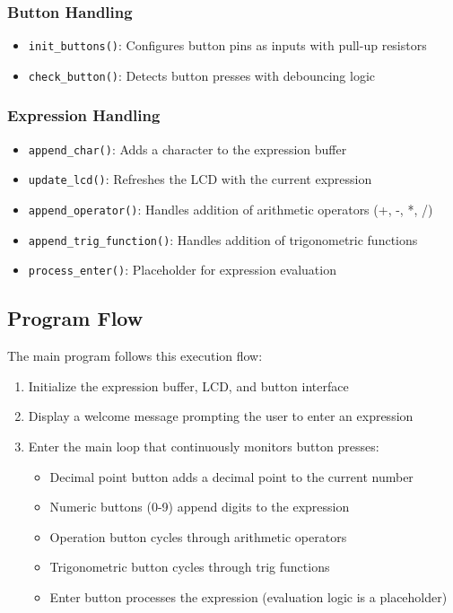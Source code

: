 \documentclass{article}
\begin{document}
\subsubsection{Button Handling}
\begin{itemize}
    \item \texttt{init\_buttons()}: Configures button pins as inputs with pull-up resistors
    \item \texttt{check\_button()}: Detects button presses with debouncing logic
\end{itemize}

\subsubsection{Expression Handling}
\begin{itemize}
    \item \texttt{append\_char()}: Adds a character to the expression buffer
    \item \texttt{update\_lcd()}: Refreshes the LCD with the current expression
    \item \texttt{append\_operator()}: Handles addition of arithmetic operators (+, -, *, /)
    \item \texttt{append\_trig\_function()}: Handles addition of trigonometric functions
    \item \texttt{process\_enter()}: Placeholder for expression evaluation
\end{itemize}

\subsection{Program Flow}
The main program follows this execution flow:
\begin{enumerate}
    \item Initialize the expression buffer, LCD, and button interface
    \item Display a welcome message prompting the user to enter an expression
    \item Enter the main loop that continuously monitors button presses:
    \begin{itemize}
        \item Decimal point button adds a decimal point to the current number
        \item Numeric buttons (0-9) append digits to the expression
        \item Operation button cycles through arithmetic operators
        \item Trigonometric button cycles through trig functions
        \item Enter button processes the expression (evaluation logic is a placeholder)
    \end{itemize}
\end{enumerate}
\end{document}
